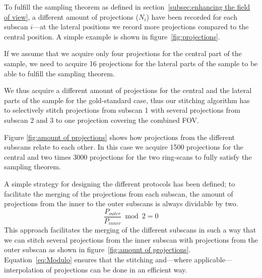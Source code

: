 To fulfill the sampling theorem as defined in section~\ref{subsec:enhancing the field of view}, a different amount of projections ($N_{i}$) have been recorded for each subscan $i$---at the lateral positions we record more projections compared to the central position. A simple example is shown in figure~\ref{fig:projections}.

\cbstart
If we assume that we acquire only four projections for the central part of the sample, we need to acquire 16 projections for the lateral parts of the sample to be able to fulfill the sampling theorem.

We thus acquire a different amount of projections for the central and the lateral parts of the sample for the gold-standard case, thus our stitching algorithm has to selectively stitch projections from subscan 1 with several projections from subscan 2 and 3 to one projection covering the combined FOV.
\cbend

\cbstart
\begin{figure*}
	\centering
	
	\caption{Setup with one central (green) and two lateral scans (red and blue, respectively). For demonstration purposes, the central scan has four projections and the lateral scans have eight projections each (all acquired over \SI{180}{\degree}. The colors of the three positions correspond to the colors shown in figure~\ref{subfig:scanning-possibilities}.}
	\label{fig:projections}
\end{figure*}
\cbend

Figure \ref{fig:amount of projections} shows how projections from the different subscans relate to each other. In this case we acquire 1500 projections for the central and two times 3000 projections for the two ring-scans to fully satisfy the sampling theorem. 

A simple strategy for designing the different protocols has been defined; to facilitate the merging of the projections from each subscan, the amount of projections from the inner to the outer subscans is always dividable by two.
\begin{equation}
	\frac{P_{outer}}{P_{inner}} \bmod 2 = 0
\label{eq:Modulo}
\end{equation}
This approach facilitates the merging of the different subscans in such a way that we can stitch several projections from the inner subscan with projections from the outer subscan as shown in figure~\ref{fig:amount of projections}. Equation~\ref{eq:Modulo} ensures that the stitching and---where applicable---interpolation of projections can be done in an efficient way. 

